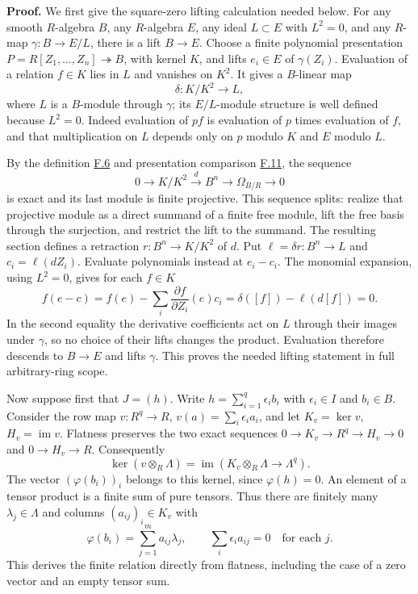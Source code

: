 \documentclass[11pt,a4paper,openany]{report}
\begin{document}
\textbf{Proof.} We first give the square-zero lifting calculation needed below. For any smooth \(R\)-algebra \(B\), any \(R\)-algebra \(E\), any ideal \(L\subset E\) with \(L^2=0\), and any \(R\)-map \(\gamma:B\to E/L\), there is a lift \(B\to E\). Choose a finite polynomial presentation \(P=R[Z_1,\ldots,Z_n]\twoheadrightarrow B\), with kernel \(K\), and lifts \(e_i\in E\) of \(\gamma(Z_i)\). Evaluation of a relation \(f\in K\) lies in \(L\) and vanishes on \(K^2\). It gives a \(B\)-linear map \[\delta:K/K^2\longrightarrow L,\] where \(L\) is a \(B\)-module through \(\gamma\); its \(E/L\)-module structure is well defined because \(L^2=0\). Indeed evaluation of \(pf\) is evaluation of \(p\) times evaluation of \(f\), and that multiplication on \(L\) depends only on \(p\) modulo \(K\) and \(E\) modulo \(L\).

By the definition \hyperref[AG-RG-S05-algebra-definition-smooth]{F.6} and presentation comparison \hyperref[AG-RG-S05-algebra-lemma-NL-homotopy]{F.11}, the sequence \[0\longrightarrow K/K^2\xrightarrow{d}B^n\longrightarrow\Omega_{B/R}\longrightarrow0\] is exact and its last module is finite projective. This sequence splits: realize that projective module as a direct summand of a finite free module, lift the free basis through the surjection, and restrict the lift to the summand. The resulting section defines a retraction \(r:B^n\to K/K^2\) of \(d\). Put \(\ell=\delta r:B^n\to L\) and \(c_i=\ell(dZ_i)\). Evaluate polynomials instead at \(e_i-c_i\). The monomial expansion, using \(L^2=0\), gives for each \(f\in K\) \[ f(e-c)=f(e)-\sum_i\frac{\partial f}{\partial Z_i}(e)c_i
 =\delta([f])-\ell(d[f])=0.\] In the second equality the derivative coefficients act on \(L\) through their images under \(\gamma\), so no choice of their lifts changes the product. Evaluation therefore descends to \(B\to E\) and lifts \(\gamma\). This proves the needed lifting statement in full arbitrary-ring scope.

Now suppose first that \(J=(h)\). Write \(h=\sum_{i=1}^q\epsilon_i b_i\) with \(\epsilon_i\in I\) and \(b_i\in B\). Consider the row map \(v:R^q\to R\), \(v(a)=\sum_i\epsilon_i a_i\), and let \(K_v=\ker v\), \(H_v=\operatorname{im}v\). Flatness preserves the two exact sequences \(0\to K_v\to R^q\to H_v\to0\) and \(0\to H_v\to R\). Consequently \[\ker(v\otimes_R\Lambda)=\operatorname{im}(K_v\otimes_R\Lambda\longrightarrow\Lambda^q).\] The vector \((\varphi(b_i))_i\) belongs to this kernel, since \(\varphi(h)=0\). An element of a tensor product is a finite sum of pure tensors. Thus there are finitely many \(\lambda_j\in\Lambda\) and columns \((a_{ij})_i\in K_v\) with \[\varphi(b_i)=\sum_{j=1}^m a_{ij}\lambda_j,\qquad
\sum_i\epsilon_i a_{ij}=0\quad\text{for each }j.\] This derives the finite relation directly from flatness, including the case of a zero vector and an empty tensor sum.
\end{document}
